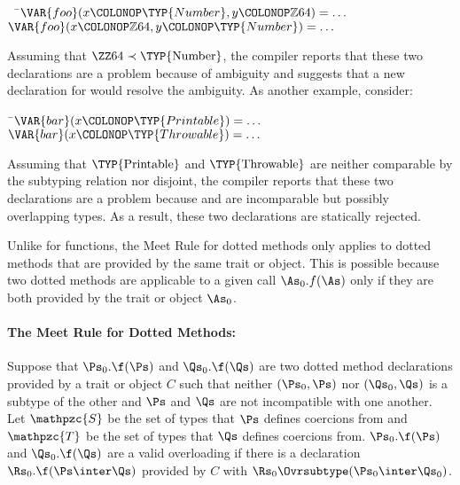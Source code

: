 \begin{Fortress}
{\tt~~}\pushtabs\=\+\(  \VAR{foo}(x\COLONOP\TYP{Number}, y\COLONOP\mathbb{Z}64) = \ldots\)\\
\(  \VAR{foo}(x\COLONOP\mathbb{Z}64, y\COLONOP\TYP{Number}) = \ldots\)\-\\\poptabs
\end{Fortress}

Assuming that \(\hbox{\ZZ64} \prec \hbox{\TYP{Number}}\), the compiler
reports that these two declarations are a problem because of ambiguity
and suggests that a new declaration for  would resolve the ambiguity. As another example, consider:

\begin{Fortress}
{\tt~}\pushtabs\=\+\( \VAR{bar}(x\COLONOP\TYP{Printable}) = \ldots\)\\
\( \VAR{bar}(x\COLONOP\TYP{Throwable}) = \ldots\)\-\\\poptabs
\end{Fortress}

Assuming that $\hbox{\TYP{Printable}}$ and $\hbox{\TYP{Throwable}}$
are neither comparable by the subtyping relation nor disjoint, the
compiler reports that these two declarations are a problem because
 and  are incomparable but possibly
overlapping types.
As a result, these two declarations are statically rejected.

Unlike for functions, the Meet Rule for dotted methods only applies to
dotted methods that are provided by the same trait or object.  This is
possible because two dotted methods are applicable to a given call
$\As_0.f(\As)$ only if they are both provided by the trait or object
$\As_0$.

\paragraph{The Meet Rule for Dotted Methods:}
Suppose that $\Ps_0.\f(\Ps)$ and $\Qs_0.\f(\Qs)$ are two dotted method
declarations provided by a trait or object $C$ such that neither
$(\Ps_0, \Ps)$ nor $(\Qs_0, \Qs)$ is a subtype of the other and $\Ps$
and $\Qs$ are not incompatible with one another.
Let $\mathpzc{S}$ be the set of
types that $\Ps$ defines coercions from and $\mathpzc{T}$ be the set
of types that $\Qs$ defines coercions from.
$\Ps_0.\f(\Ps)$ and
$\Qs_0.\f(\Qs)$ are a valid overloading if
there is a declaration $\Rs_0.\f(\Ps
\inter \Qs)$ provided by $C$ with $\Rs_0 \Ovrsubtype (\Ps_0 \inter
\Qs_0)$.

